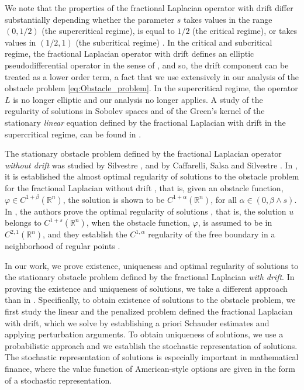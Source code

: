 \documentclass[11pt,reqno]{amsart}
\theoremstyle{definition}
\theoremstyle{remark}
\begin{document}
We note that the properties of the fractional Laplacian operator with drift differ substantially depending whether the parameter $s$ takes values in the range $(0,1/2)$ (the supercritical regime), is equal to $1/2$ (the critical regime), or takes values in $(1/2,1)$ (the subcritical regime) \cite[\S 1]{Silvestre_2012a, Caffarelli_Vasseur_2010}. In the critical and subcritical regime, the fractional Laplacian operator with drift defines an elliptic pseudodifferential operator in the sense of \cite[\S 3.9]{Taylor_vol1}, and so, the drift component can be treated as a lower order term, a fact that we use extensively in our analysis of the obstacle problem \eqref{eq:Obstacle_problem}. In the supercritical regime, the operator $L$ is no longer elliptic and our analysis no longer applies. A study of the regularity of solutions in Sobolev spaces and of the Green's kernel of the stationary \emph{linear} equation defined by the fractional Laplacian with drift in the supercritical regime, can be found in \cite{Epstein_Pop_2013}.

The stationary obstacle problem defined by the fractional Laplacian operator \emph{without drift} was studied by Silvestre \cite{Silvestre_2007}, and by Caffarelli, Salsa and Silvestre \cite{Caffarelli_Salsa_Silvestre_2008}. In \cite{Silvestre_2007}, it is established the almost optimal regularity of solutions to the obstacle problem for the fractional Laplacian without drift \cite[Theorem 5.8]{Silvestre_2007}, that is, given an obstacle function, $\varphi\in C^{1+\beta}({\mathbb{R}}^n)$, the solution is shown to be $C^{1+\alpha}({\mathbb{R}}^n)$, for all $\alpha \in (0,\beta\wedge s)$. In \cite{Caffarelli_Salsa_Silvestre_2008}, the authors prove the optimal regularity of solutions \cite[Corollary 6.8]{Caffarelli_Salsa_Silvestre_2008}, that is, the solution $u$ belongs to $C^{1+s}({\mathbb{R}}^n)$, when the obstacle function, $\varphi$, is assumed to be in $C^{2,1}({\mathbb{R}}^n)$, and they establish the $C^{1,\alpha}$ regularity of the free boundary in a neighborhood of regular points \cite[Theorem 7.7]{Caffarelli_Salsa_Silvestre_2008}. 

In our work, we prove existence, uniqueness and optimal regularity of solutions to the stationary obstacle problem defined by the fractional Laplacian \emph{with drift}. In proving the existence and uniqueness of solutions, we take a different approach than in \cite{Silvestre_2007, Caffarelli_Salsa_Silvestre_2008}. Specifically, to obtain existence of solutions to the obstacle problem, we first study the linear and the penalized problem defined the fractional Laplacian with drift, which we solve by establishing a priori Schauder estimates and applying perturbation arguments. To obtain uniqueness of solutions, we use a probabilistic approach and we establish the stochastic representation of solutions. The stochastic representation of solutions is especially important in mathematical finance, where the value function of American-style options are given in the form of a stochastic representation. 
\end{document}
